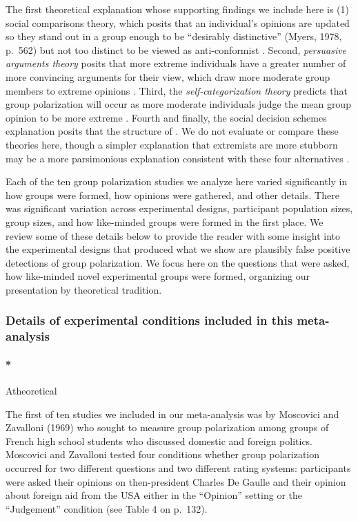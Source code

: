 \documentclass[
  abstract]{article}
\let\oldparagraph\paragraph
\renewcommand{\paragraph}[1]{\oldparagraph{#1}\mbox{}}
\begin{document}
The first theoretical explanation whose supporting findings we include
here is (1) social comparisons theory, which posits that an individual's
opinions are updated so they stand out in a group enough to be
``desirably distinctive'' (Myers, 1978, p.~562) but not too distinct to
be viewed as anti-conformist \autocite{Brown1974,Sanders1977,Myers1978}.
Second, \emph{persuasive arguments theory} posits that more extreme
individuals have a greater number of more convincing arguments for their
view, which draw more moderate group members to extreme opinions
\autocite{Burnstein1973,Burnstein1975,Burnstein1977}. Third, the
\emph{self-categorization theory} predicts that group polarization will
occur as more moderate individuals judge the mean group opinion to be
more extreme \autocite{Turner1989,Abrams1990,Krizan2007}. Fourth and
finally, the social decision schemes explanation posits that the
structure of \autocite{Davis1973,Zuber1992,Friedkin1999a}. We do not
evaluate or compare these theories here, though a simpler explanation
that extremists are more stubborn may be a more parsimonious explanation
consistent with these four alternatives
\autocite{Acemoglu2013,Guazzini2015,Turner2020}.

Each of the ten group polarization studies we analyze here varied
significantly in how groups were formed, how opinions were gathered, and
other details. There was significant variation across experimental
designs, participant population sizes, group sizes, and how like-minded
groups were formed in the first place. We review some of these details
below to provide the reader with some insight into the experimental
designs that produced what we show are plausibly false positive
detections of group polarization. We focus here on the questions that
were asked, how like-minded novel experimental groups were formed,
organizing our presentation by theoretical tradition.

\subsubsection{Details of experimental conditions included in this
meta-analysis}\label{details-of-experimental-conditions-included-in-this-meta-analysis}

\paragraph*{Atheoretical}

The first of ten studies we included in our meta-analysis was by
Moscovici and Zavalloni (1969) \autocite{Moscovici1969} who sought to
measure group polarization among groups of French high school students
who discussed domestic and foreign politics. Moscovici and Zavalloni
tested four conditions whether group polarization occurred for two
different questions and two different rating systems: participants were
asked their opinions on then-president Charles De Gaulle and their
opinion about foreign aid from the USA either in the ``Opinion'' setting
or the ``Judgement'' condition (see Table 4 on p.~132).
\end{document}
